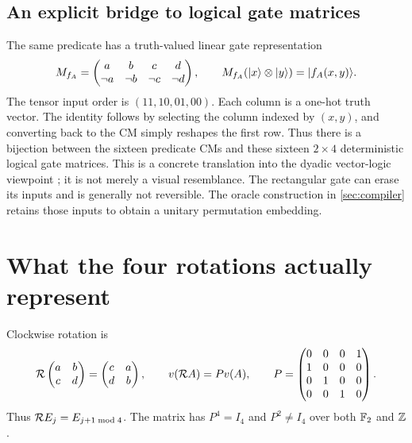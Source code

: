\subsection{An explicit bridge to logical gate matrices}\label{sec:logicalgate}
The same predicate has a truth-valued linear gate representation
\begin{equation}\label{eq:logicalgate}
 M_{f_A}=\begin{pmatrix}a&b&c&d\\\neg a&\neg b&\neg c&\neg d\end{pmatrix},
 \qquad M_{f_A}(\lvert x\rangle\otimes\lvert y\rangle)=\lvert f_A(x,y)\rangle.
\end{equation}
The tensor input order is $(11,10,01,00)$. Each column is a one-hot truth vector. The identity follows by selecting the column indexed by $(x,y)$, and converting back to the CM simply reshapes the first row. Thus there is a bijection between the sixteen predicate CMs and these sixteen $2\times4$ deterministic logical gate matrices. This is a concrete translation into the dyadic vector-logic viewpoint \cite{mizraji2008}; it is not merely a visual resemblance. The rectangular gate can erase its inputs and is generally not reversible. The oracle construction in \cref{sec:compiler} retains those inputs to obtain a unitary permutation embedding.

\section{What the four rotations actually represent}\label{sec:rotation}
Clockwise rotation is
\begin{equation}
 \mathcal R\begin{pmatrix}a&b\\c&d\end{pmatrix}=\begin{pmatrix}c&a\\d&b\end{pmatrix},\qquad
 v(\mathcal R A)=Pv(A),\qquad
 P=\begin{pmatrix}0&0&0&1\\1&0&0&0\\0&1&0&0\\0&0&1&0\end{pmatrix}.
\end{equation}
Thus $\mathcal R E_j=E_{j+1\bmod4}$. The matrix has $P^4=I_4$ and $P^2\ne I_4$ over both $\mathbb F_2$ and $\mathbb Z$.

